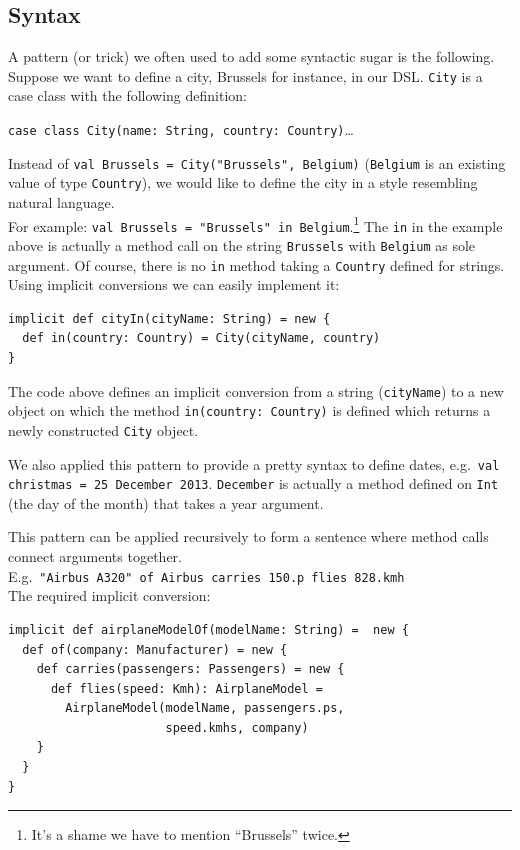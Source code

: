 \documentclass[a4paper]{article}
\newcommand{\cc}[1]{\texttt{#1}}
\renewcommand{\sc}[1]{\lstinline{#1}}
\begin{document}
\subsection{Syntax}
\label{sec:implementation-syntax}

A pattern (or trick) we often used to add some syntactic sugar is the following.
Suppose we want to define a city, Brussels for instance, in our DSL.\@
\cc{City} is a case class with the following definition:

\sc{case class City(name: String, country: Country)}\ldots{}

Instead of \sc{val Brussels = City("Brussels", Belgium)} (\cc{Belgium} is an existing value of type \cc{Country}), we would like to define the city in a style resembling natural language.\\
For example: \sc{val Brussels = "Brussels" in Belgium}.\footnote{It's a shame we have to mention ``Brussels'' twice.}
The \sc{in} in the example above is actually a method call on the string \cc{Brussels} with \cc{Belgium} as sole argument.
Of course, there is no \sc{in} method taking a \cc{Country} defined for strings.
Using implicit conversions we can easily implement it:

\begin{lstlisting}
implicit def cityIn(cityName: String) = new {
  def in(country: Country) = City(cityName, country)
}
\end{lstlisting}

The code above defines an implicit conversion from a string (\sc{cityName}) to a new object on which the method \sc{in(country: Country)} is defined which returns a newly constructed \cc{City} object.

We also applied this pattern to provide a pretty syntax to define dates, e.g.\ \sc{val christmas = 25 December 2013}.
\cc{December} is actually a method defined on \cc{Int} (the day of the month) that takes a year argument.

This pattern can be applied recursively to form a sentence where method calls connect arguments together.\\
E.g.\ \sc{"Airbus A320" of Airbus carries 150.p flies 828.kmh}\\
The required implicit conversion:

\begin{lstlisting}
implicit def airplaneModelOf(modelName: String) =  new {
  def of(company: Manufacturer) = new {
    def carries(passengers: Passengers) = new {
      def flies(speed: Kmh): AirplaneModel =
        AirplaneModel(modelName, passengers.ps,
                      speed.kmhs, company)
    }
  }
}
\end{lstlisting}
\end{document}
